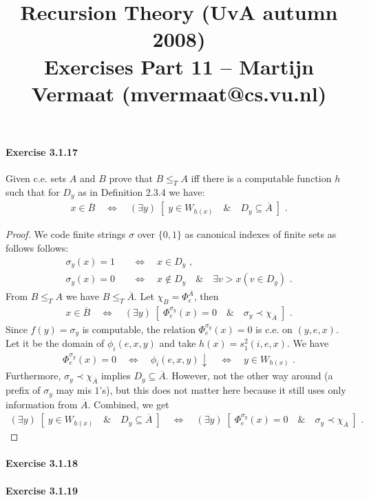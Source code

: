 \documentclass[a4paper,11pt]{article}
\title{Recursion Theory (UvA autumn 2008)\\
\normalsize{Exercises Part 11 -- Martijn Vermaat (mvermaat@cs.vu.nl)}}
\date{}
\begin{document}
\maketitle


\paragraph{Exercise 3.1.17}

Given c.e. sets $A$ and $B$ prove that $B \leq_T A$ iff there is a computable
function $h$ such that for $D_y$ as in Definition 2.3.4 we have:
\begin{align*}
  x \in \overline{B} \quad \Longleftrightarrow \quad (\exists y) \; [ \; y \in W_{h(x)} \quad \& \quad D_y \subseteq \overline{A} \; ] \text{ .}
\end{align*}

\begin{proof}
We code finite strings $\sigma$ over $\{0, 1\}$ as canonical indexes of
finite sets as follows follows:
\begin{align*}
  \sigma_y(x) = 1 \quad & \Longleftrightarrow \quad x \in D_y \text{ ,} \\
  \sigma_y(x) = 0 \quad & \Longleftrightarrow \quad x \notin D_y \quad \& \quad \exists v \! > \! x (v \in D_y) \text{ .}
\end{align*}
From $B \leq_T A$ we have $B \leq_T \overline{A}$.
Let $\chi_B = \Phi^{\overline{A}}_e$, then
\begin{align*}
  x \in \overline{B} \quad \Longleftrightarrow \quad (\exists y) \; [ \; \Phi^{\sigma_y}_e(x) = 0 \quad \& \quad \sigma_y \prec \chi_{\overline{A}} \; ] \text{ .}
\end{align*}
Since $f(y) = \sigma_y$ is computable, the relation $\Phi^{\sigma_y}_e(x) = 0$ is c.e. on $(y, e, x)$.
Let it be the domain of $\phi_i(e, x, y)$ and take $h(x) = s^2_1(i, e, x)$. We have
\begin{align*}
  \Phi^{\sigma_y}_e(x) = 0 \quad \Longleftrightarrow \quad \phi_i(e, x, y) \! \downarrow \quad \Longleftrightarrow \quad y \in W_{h(x)} \text{ .}
\end{align*}
Furthermore, $\sigma_y \prec \chi_{\overline{A}}$ implies $D_y \subseteq \overline{A}$.
However, not the other way around (a prefix of $\sigma_y$ may mis $1$'s), but this does not
matter here because it still uses only information from $\overline{A}$. Combined, we get
\begin{align*}
  (\exists y) \; [ \; y \in W_{h(x)} \quad \& \quad D_y \subseteq \overline{A} \; ] \quad \Longleftrightarrow \quad (\exists y) \; [ \; \Phi^{\sigma_y}_e(x) = 0 \quad \& \quad \sigma_y \prec \chi_{\overline{A}} \; ] \text{ .}
\end{align*}

\end{proof}


\paragraph{Exercise 3.1.18}


\paragraph{Exercise 3.1.19}
\end{document}
